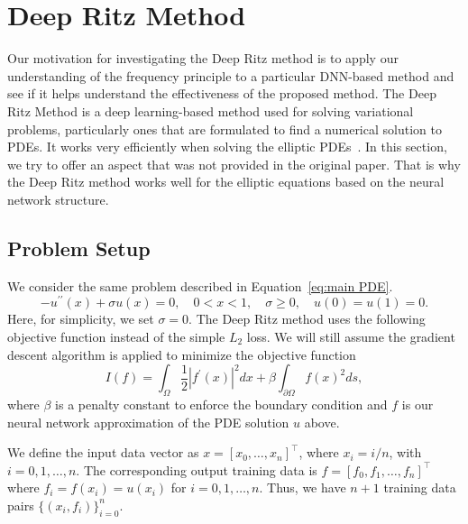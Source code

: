 \documentclass[letterpaper,12pt]{article}
\begin{document}
\section{Deep Ritz Method}
Our motivation for investigating the Deep Ritz method \cite{e2017deep} is to apply our understanding of the frequency principle to a particular DNN-based method and see if it helps understand the effectiveness of the proposed method. The Deep Ritz Method is a deep learning-based method used for solving variational problems, particularly ones that are formulated to find a numerical solution to PDEs. It works very efficiently when solving the elliptic PDEs~\cite{e2017deep}. In this section, we try to offer an aspect that was not provided in the original paper. That is why the Deep Ritz method works well for the elliptic equations based on the neural network structure.


\subsection{Problem Setup}
We consider the same problem described in Equation~\eqref{eq:main PDE}.
\begin{equation}
-u^{\prime \prime}(x)+\sigma u(x)=0, \quad 0<x<1, \quad \sigma \geq 0,\quad u(0)=u(1)=0.
\end{equation}
Here, for simplicity, we set $\sigma=0$.
\noindent 
The Deep Ritz method uses the following objective function instead of the simple $L_{2}$ loss. We will still assume the gradient descent algorithm is applied to minimize the objective function 
\begin{equation}
I(f)=\int_{\Omega} \frac{1}{2}| f^{\prime}(x)|^{2} d x+\beta \int_{\partial \Omega} f(x)^{2} d s,
\end{equation}
where $\beta$ is a penalty constant to enforce the boundary condition and $f$ is our neural network approximation of the PDE solution $u$ above. 

We define the input data vector as $x = [x_0,\ldots,x_n]^\top$, where $x_{i}=i/n$, with $i=0,1, \ldots, n$. The corresponding output training data is $f=\left[f_0,f_1,\ldots, f_n\right]^{\top}$ where $f_i = f(x_i) = u(x_i)$ for $i=0,1, \ldots, n$. Thus, we have $n+1$ training data pairs $\{(x_i, f_i)\}_{i=0}^n$.
\end{document}

